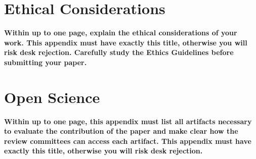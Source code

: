 \section*{Ethical Considerations}
\textbf{Within up to one page, explain the ethical considerations of your work. This appendix must have exactly this title, otherwise you will risk desk rejection. Carefully study the Ethics Guidelines before submitting your paper.}
\cleardoublepage

\section*{Open Science}
\textbf{Within up to one page, this appendix must list all artifacts necessary to evaluate the contribution of the paper and make clear how the review committees can access each artifact. This appendix must have exactly this title, otherwise you will risk desk rejection. }
\cleardoublepage





